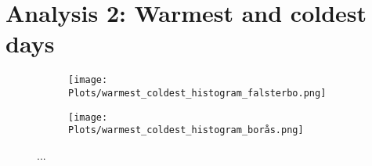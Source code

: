 \section{Analysis 2: Warmest and coldest days}

\begin{figure}[H]
    \centering
    \begin{subfigure}[b]{0.49\linewidth}
        \centering
        \texttt{[image: Plots/warmest\_coldest\_histogram\_falsterbo.png]}
        \caption{}
        \label{fig:rwarmestcoldestfalsterbo}
    \end{subfigure}
    \begin{subfigure}[b]{0.49\linewidth}
        \centering
        \texttt{[image: Plots/warmest\_coldest\_histogram\_borås.png]}
        \caption{}
        \label{fig:warmestcoldestboras}
    \end{subfigure}
    \caption{...}
    \label{}

\end{figure}